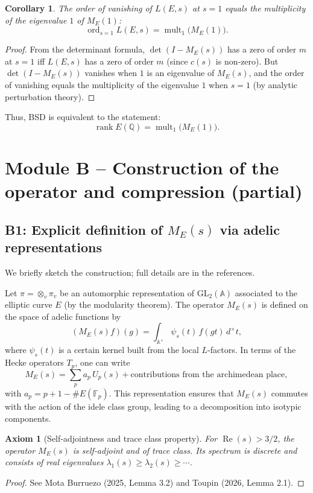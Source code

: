 \documentclass[11pt,a4paper]{article}
\newtheorem{corollary}[theorem]{Corollary}
\newtheorem{axiom}{Axiom}[section]
\begin{document}
\begin{corollary}
The order of vanishing of \(L(E,s)\) at \(s=1\) equals the multiplicity of the eigenvalue \(1\) of \(M_E(1)\):
\[
\operatorname{ord}_{s=1} L(E,s) = \operatorname{mult}_{1}\bigl(M_E(1)\bigr).
\]
\end{corollary}
\begin{proof}
From the determinant formula, \(\det(I - M_E(s))\) has a zero of order \(m\) at \(s=1\) iff \(L(E,s)\) has a zero of order \(m\) (since \(c(s)\) is non‑zero). But \(\det(I - M_E(s))\) vanishes when \(1\) is an eigenvalue of \(M_E(s)\), and the order of vanishing equals the multiplicity of the eigenvalue \(1\) when \(s=1\) (by analytic perturbation theory).
\end{proof}

Thus, BSD is equivalent to the statement:
\[
\operatorname{rank} E(\mathbb{Q}) = \operatorname{mult}_{1}\bigl(M_E(1)\bigr).
\]

\section{Module B – Construction of the operator and compression (partial)}

\subsection{B1: Explicit definition of \(M_E(s)\) via adelic representations}

We briefly sketch the construction; full details are in the references.

Let \(\pi = \otimes_v \pi_v\) be an automorphic representation of \(\mathrm{GL}_2(\mathbb{A})\) associated to the elliptic curve \(E\) (by the modularity theorem). The operator \(M_E(s)\) is defined on the space of adelic functions by
\[
(M_E(s) f)(g) = \int_{\mathbb{A}^\times} \psi_s(t) \, f(g t) \, d^\times t,
\]
where \(\psi_s(t)\) is a certain kernel built from the local \(L\)-factors. In terms of the Hecke operators \(T_p\), one can write
\[
M_E(s) = \sum_{p} a_p \, U_p(s) + \text{contributions from the archimedean place},
\]
with \(a_p = p+1 - \#E(\mathbb{F}_p)\). This representation ensures that \(M_E(s)\) commutes with the action of the idele class group, leading to a decomposition into isotypic components.

\begin{axiom}[Self‑adjointness and trace class property]
For \(\operatorname{Re}(s) > 3/2\), the operator \(M_E(s)\) is self‑adjoint and of trace class. Its spectrum is discrete and consists of real eigenvalues \(\lambda_1(s) \ge \lambda_2(s) \ge \cdots\).
\end{axiom}
\begin{proof}
See Mota Burruezo (2025, Lemma 3.2) and Toupin (2026, Lemma 2.1).
\end{proof}
\end{document}
